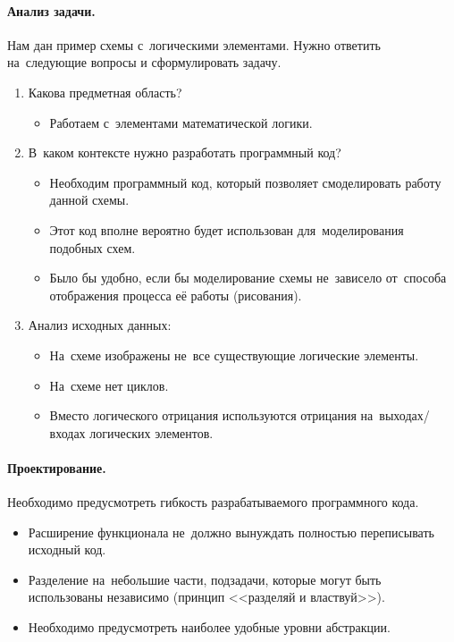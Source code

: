 \paragraph{Анализ задачи.}
Нам дан пример схемы с~логическими элементами. Нужно ответить на~следующие вопросы и сформулировать задачу.
\begin{enumerate}
  \item Какова предметная область?
  \begin{itemize}
      \item Работаем с~элементами математической логики.
  \end{itemize}

  \item В~каком контексте нужно разработать программный код?
  \begin{itemize}
    \item Необходим программный код, который позволяет смоделировать работу данной схемы.
    \item Этот код вполне вероятно будет использован для~моделирования подобных схем.
    \item Было бы удобно, если бы моделирование схемы не~зависело от~способа отображения процесса её работы (рисования).
  \end{itemize}

  \item Анализ исходных данных:
  \begin{itemize}
    \item На~схеме изображены не~все существующие логические элементы.
    \item На~схеме нет циклов.
    \item Вместо логического отрицания используются отрицания на~выходах/входах логических элементов.
  \end{itemize}
\end{enumerate}



\paragraph{Проектирование.}
Необходимо предусмотреть гибкость разрабатываемого программного кода.
\begin{itemize}
  \item Расширение функционала не~должно вынуждать полностью переписывать исходный код.
  \item Разделение на~небольшие части, подзадачи, которые могут быть использованы независимо (принцип <<разделяй и властвуй>>).
  \item Необходимо предусмотреть наиболее удобные уровни абстракции.
\end{itemize}

